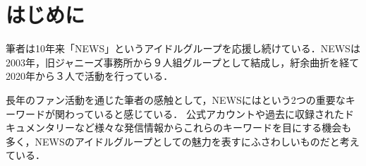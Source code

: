 

\section{はじめに}\label{sec:hajimeni}

筆者は10年来「NEWS」というアイドルグループを応援し続けている．NEWSは2003年，旧ジャニーズ事務所から９人組グループとして結成し，紆余曲折を経て2020年から３人で活動を行っている．

長年のファン活動を通じた筆者の感触として，NEWSには\senaka \emotional という2つの重要なキーワードが関わっていると感じている．
公式アカウント\cite{NEWS_Chill}や過去に収録されたドキュメンタリー\cite{Ongaku}など様々な発信情報からこれらのキーワードを目にする機会も多く，NEWSのアイドルグループとしての魅力を表すにふさわしいものだと考えている．






